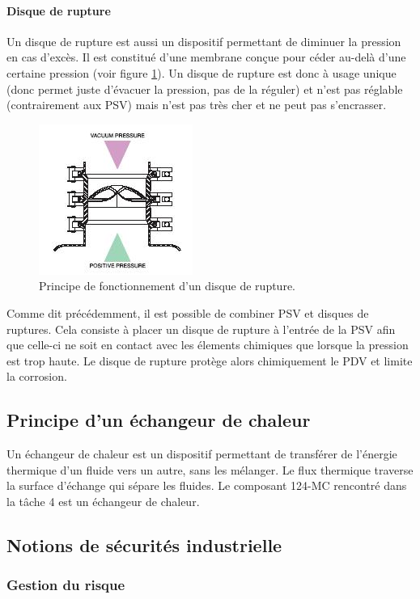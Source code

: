 \paragraph{Disque de rupture}
Un disque de rupture est aussi un dispositif
permettant de diminuer la pression en cas d'excès.
Il est constitué d'une membrane conçue pour céder
au-delà d'une certaine pression 
(voir figure \ref{fig:rupture-disc}). Un disque
de rupture est donc à usage unique (donc permet juste
d'évacuer la pression, pas de la réguler) et n'est pas
réglable (contrairement aux PSV) mais n'est pas
très cher et ne peut pas s'encrasser.

\begin{figure}[ht]
	\centering
	\includegraphics[scale=0.8]{media/rupture-disc.jpg}
	\caption{Principe de fonctionnement d'un disque de rupture.}
	\label{fig:rupture-disc}
\end{figure}

Comme dit précédemment, il est possible de combiner
PSV et disques de ruptures. Cela consiste à
placer un disque de rupture à l'entrée de la PSV
afin que celle-ci ne soit en contact avec les élements
chimiques que lorsque la pression est trop haute. Le
disque de rupture protège alors chimiquement le PDV et
limite la corrosion.

\subsection{Principe d'un échangeur de chaleur}
Un échangeur de chaleur est un dispositif permettant
de transférer de l'énergie thermique d'un fluide
vers un autre, sans les mélanger. Le flux thermique
traverse la surface d'échange qui sépare les fluides.
Le composant 124-MC rencontré dans la tâche 4 est un
échangeur de chaleur.

\subsection{Notions de sécurités industrielle}
\subsubsection{Gestion du risque}
